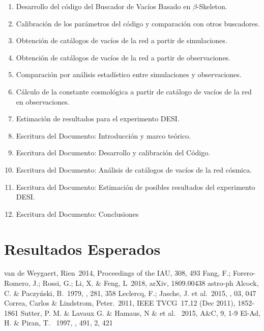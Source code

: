 \documentclass[preprint]{aastex62}
\begin{document}
  
  \begin{enumerate}
  \item Desarrollo del código del Buscador de Vacíos Basado en $\beta$-Skeleton.
  \item Calibración de los parámetros del código y comparación con otros buscadores.
  \item Obtención de catálogos de vacíos de la red a partir de simulaciones.
  \item Obtención de catálogos de vacíos de la red a partir de observaciones.
  \item Comparación por análisis estadístico entre simulaciones y observaciones.
  \item Cálculo de la constante cosmológica a partir de catálogo de vacíos de la red en
    observaciones.
  \item Estimación de resultados para el experimento DESI.
  \item Escritura del Documento: Introducción y marco teórico.
  \item Escritura del Documento: Desarrollo y calibración del Código.
  \item Escritura del Documento: Análisis de catálogos de vacíos de la red cósmica. 
  \item Escritura del Documento: Estimación de posibles resultados del experimento DESI.
  \item Escritura del Documento: Conclusiones
  \end{enumerate}
  
  
  \section{Resultados Esperados}

  
  \nocite{*}


\begin{thebibliography}{}                                                       

 van de Weygaert, Rien\ 2014, Proceedings of the IAU, 308, 493   
 Fang, F.; Forero-Romero, J.; Rossi, G.; Li, X. \& Feng, L\ 2018, arXiv, 1809.00438 astro-ph
 Alcock, C. \& Paczy\'nski, B.\ 1979, \nat, 281, 358
 Leclercq, F.; Jasche, J. et al.\ 2015, \jcap, 03, 047
 Correa, Carlos \& Lindstrom, Peter.\ 2011,  IEEE TVCG\ 17,12 (Dec 2011), 1852-1861
 Sutter, P. M. \& Lavaux G. \& Hamaus, N \& et al. \ 2015, A\&C, 9, 1-9
 El-Ad, H. \& Piran, T. \ 1997, \apj, 491, 2, 421
  
\end{thebibliography}                                                           
                       

\end{document}
